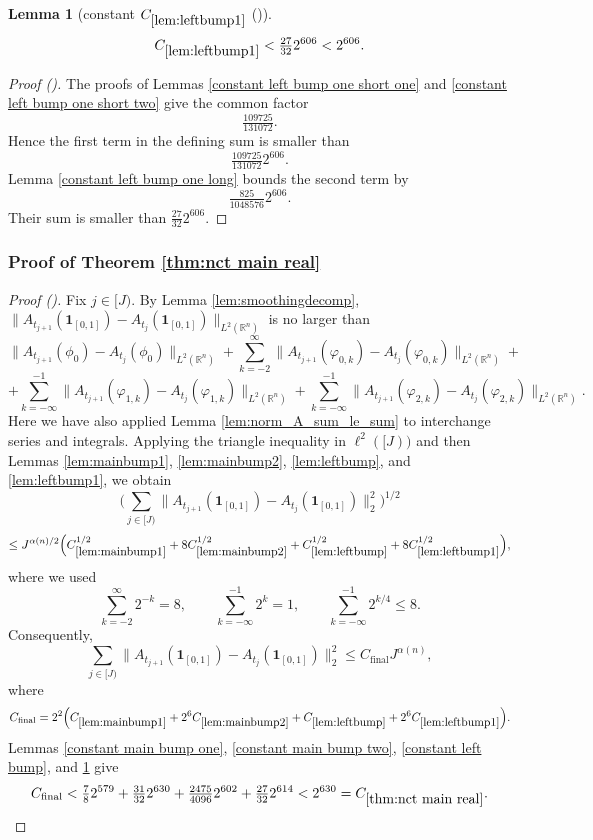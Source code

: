 \documentclass[12pt,reqno]{amsart}
\newcommand{\auto}{{({\tiny\faCar})}}
\theoremstyle{plain}
\newtheorem{lemma}[theorem]{Lemma}
\numberwithin{equation}{section}
\theoremstyle{remark}
\newcommand{\using}[1]{}
\newcommand{\R}{{\mathbb R}}
\begin{document}
\begin{lemma}[constant $C_{\ref{lem:leftbump1}}$ \auto]\label{constant left bump one}\using{constant left bump one short one}\using{constant left bump one short two}\using{constant left bump one long}\using{lem:leftbump1}
\begin{equation}\label{constant left bump one bound}
C_{\ref{lem:leftbump1}}<\tfrac{27}{32}2^{606}<2^{606}.
\end{equation}
\end{lemma}
\begin{proof}[Proof \auto]
The proofs of Lemmas \ref{constant left bump one short one} and \ref{constant left bump one short two} give the common factor
\[
\tfrac{109725}{131072}.
\]
Hence the first term in the defining sum is smaller than
\[
\tfrac{109725}{131072}2^{606}.
\]
Lemma \ref{constant left bump one long} bounds the second term by
\[
\tfrac{825}{1048576}2^{606}.
\]
Their sum is smaller than $\frac{27}{32}2^{606}$.
\end{proof}


\subsubsection{\texorpdfstring{Proof of Theorem \ref{thm:nct main real}}{Proof of main theorem}}
\begin{proof}[Proof \auto]
Fix $j\in [J)$.
By Lemma \ref{lem:smoothingdecomp},
$\|A_{t_{j + 1}}(\mathbf{1}_{[0,1]}) - A_{t_{j}}(\mathbf{1}_{[0,1]})\|_{{L}^2(\R^n)}$
is no larger than
\[ \|A_{t_{j+1}}(\phi_0) - A_{t_j}(\phi_0)\|_{L^2(\R^n)}  + \sum_{k=-2}^\infty\|A_{t_{j+1}}(\varphi_{0,k}) - A_{t_{j}}(\varphi_{0,k})\|_{L^2(\R^n)}  + \]
\[ +\sum_{k=-\infty}^{-1}\|A_{t_{j+1}}(\varphi_{1,k}) - A_{t_{j}}(\varphi_{1,k})\|_{L^2(\R^n)}  + \sum_{k=-\infty}^{-1}\|A_{t_{j+1}}({\varphi_{2,k}}) - A_{t_{j}}({\varphi_{2,k}})\|_{L^2(\R^n)}. \]
Here we have also applied Lemma \ref{lem:norm_A_sum_le_sum} to interchange series and integrals.
Applying the triangle inequality in $\ell^2([J))$ and then Lemmas \ref{lem:mainbump1}, \ref{lem:mainbump2}, \ref{lem:leftbump}, and \ref{lem:leftbump1}, we obtain
\[
\Big(\sum_{j\in[J)}\|A_{t_{j+1}}(\mathbf1_{[0,1]})-A_{t_j}(\mathbf1_{[0,1]})\|_2^2\Big)^{1/2}
\]
\[
\le J^{\alpha(n)/2}\Big(
C_{\ref{lem:mainbump1}}^{1/2}
+8C_{\ref{lem:mainbump2}}^{1/2}
+C_{\ref{lem:leftbump}}^{1/2}
+8C_{\ref{lem:leftbump1}}^{1/2}
\Big),
\]
where we used
\[
\sum_{k=-2}^\infty2^{-k}=8,
\qquad
\sum_{k=-\infty}^{-1}2^k=1,
\qquad
\sum_{k=-\infty}^{-1}2^{k/4}\le8.
\]
Consequently,
\[
\sum_{j\in[J)}\|A_{t_{j+1}}(\mathbf1_{[0,1]})-A_{t_j}(\mathbf1_{[0,1]})\|_2^2
\le C_{\mathrm{final}}J^{\alpha(n)},
\]
where
\[
C_{\mathrm{final}}
=2^2\Big(
C_{\ref{lem:mainbump1}}
+2^6C_{\ref{lem:mainbump2}}
+C_{\ref{lem:leftbump}}
+2^6C_{\ref{lem:leftbump1}}
\Big).
\]
Lemmas \ref{constant main bump one}, \ref{constant main bump two}, \ref{constant left bump}, and \ref{constant left bump one} give
\[
C_{\mathrm{final}}
<\tfrac78 2^{579}
+\tfrac{31}{32}2^{630}
+\tfrac{2475}{4096}2^{602}
+\tfrac{27}{32}2^{614}
<2^{630}
=C_{\ref{thm:nct main real}}.
\]
\end{proof}
\end{document}
